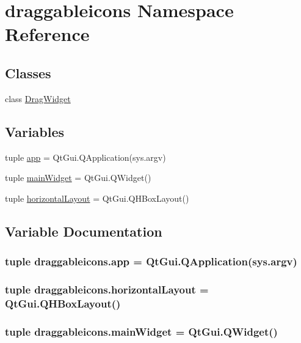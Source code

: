 \hypertarget{namespacedraggableicons}{}\section{draggableicons Namespace Reference}
\label{namespacedraggableicons}
\subsection*{Classes}
\begin{DoxyCompactItemize}
\item 
class \hyperlink{classdraggableicons_1_1DragWidget}{Drag\+Widget}
\end{DoxyCompactItemize}
\subsection*{Variables}
\begin{DoxyCompactItemize}
\item 
tuple \hyperlink{namespacedraggableicons_a47f9602e0b2a18841c488e23ed830302}{app} = Qt\+Gui.\+Q\+Application(sys.\+argv)
\item 
tuple \hyperlink{namespacedraggableicons_ac49a0db9b01b125855e3996c31f7b2d8}{main\+Widget} = Qt\+Gui.\+Q\+Widget()
\item 
tuple \hyperlink{namespacedraggableicons_a2980cf73689c11a6a8efd28a65fca9d3}{horizontal\+Layout} = Qt\+Gui.\+Q\+H\+Box\+Layout()
\end{DoxyCompactItemize}


\subsection{Variable Documentation}
\hypertarget{namespacedraggableicons_a47f9602e0b2a18841c488e23ed830302}{}
\subsubsection[{app}]{\setlength{\rightskip}{0pt plus 5cm}tuple draggableicons.\+app = Qt\+Gui.\+Q\+Application(sys.\+argv)}\label{namespacedraggableicons_a47f9602e0b2a18841c488e23ed830302}
\hypertarget{namespacedraggableicons_a2980cf73689c11a6a8efd28a65fca9d3}{}
\subsubsection[{horizontal\+Layout}]{\setlength{\rightskip}{0pt plus 5cm}tuple draggableicons.\+horizontal\+Layout = Qt\+Gui.\+Q\+H\+Box\+Layout()}\label{namespacedraggableicons_a2980cf73689c11a6a8efd28a65fca9d3}
\hypertarget{namespacedraggableicons_ac49a0db9b01b125855e3996c31f7b2d8}{}
\subsubsection[{main\+Widget}]{\setlength{\rightskip}{0pt plus 5cm}tuple draggableicons.\+main\+Widget = Qt\+Gui.\+Q\+Widget()}\label{namespacedraggableicons_ac49a0db9b01b125855e3996c31f7b2d8}
